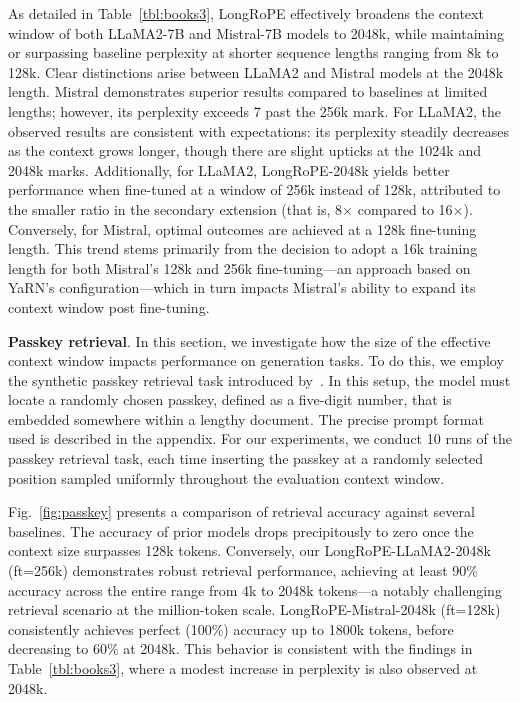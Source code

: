 As detailed in Table~\ref{tbl:books3}, LongRoPE effectively broadens the context window of both LLaMA2-7B and Mistral-7B models to 2048k, while maintaining or surpassing baseline perplexity at shorter sequence lengths ranging from 8k to 128k. Clear distinctions arise between LLaMA2 and Mistral models at the 2048k length. Mistral demonstrates superior results compared to baselines at limited lengths; however, its perplexity exceeds 7 past the 256k mark. For LLaMA2, the observed results are consistent with expectations: its perplexity steadily decreases as the context grows longer, though there are slight upticks at the 1024k and 2048k marks. Additionally, for LLaMA2, LongRoPE-2048k yields better performance when fine-tuned at a window of 256k instead of 128k, attributed to the smaller ratio in the secondary extension (that is, 8$\times$ compared to 16$\times$). Conversely, for Mistral, optimal outcomes are achieved at a 128k fine-tuning length. This trend stems primarily from the decision to adopt a 16k training length for both Mistral's 128k and 256k fine-tuning—an approach based on YaRN’s configuration—which in turn impacts Mistral’s ability to expand its context window post fine-tuning.

\textbf{Passkey retrieval}. In this section, we investigate how the size of the effective context window impacts performance on generation tasks. To do this, we employ the synthetic passkey retrieval task introduced by~\cite{passkey}. In this setup, the model must locate a randomly chosen passkey, defined as a five-digit number, that is embedded somewhere within a lengthy document. The precise prompt format used is described in the appendix. For our experiments, we conduct 10 runs of the passkey retrieval task, each time inserting the passkey at a randomly selected position sampled uniformly throughout the evaluation context window.

Fig.~\ref{fig:passkey} presents a comparison of retrieval accuracy against several baselines. The accuracy of prior models drops precipitously to zero once the context size surpasses 128k tokens. Conversely, our LongRoPE-LLaMA2-2048k (ft=256k) demonstrates robust retrieval performance, achieving at least 90\% accuracy across the entire range from 4k to 2048k tokens—a notably challenging retrieval scenario at the million-token scale. LongRoPE-Mistral-2048k (ft=128k) consistently achieves perfect (100\%) accuracy up to 1800k tokens, before decreasing to 60\% at 2048k. This behavior is consistent with the findings in Table~\ref{tbl:books3}, where a modest increase in perplexity is also observed at 2048k.

